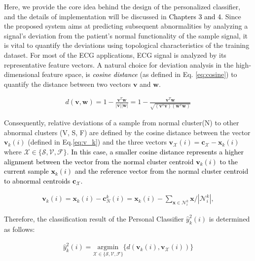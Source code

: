 Here, we provide the core idea behind the design of the personalized classifier, and the details of implementation will be discussed in \textcolor{black}{Chapters 3 and 4.} 
Since the proposed system aims at predicting subsequent abnormalities by analyzing a signal's deviation from the patient's normal functionality of the sample signal, it is vital to quantify the deviations using topological characteristics of the training dataset. For most of the ECG applications, ECG signal is analyzed by its representative feature vectors. A natural choice for deviation analysis in the high-dimensional feature space, is \textcolor{black}{\textit{cosine distance}} (as defined in Eq. \ref{eq:cosine}) to quantify the distance between two vectors $\textbf{v}$ and $\textbf{w}$.

\begin{align}
\label{eq:cosine}
d(\mathbf{v},\mathbf{w})= 1 - \frac{\mathbf{v}^T\mathbf{w}}{|\mathbf{v}||\mathbf{w}|}=1 - \frac{\mathbf{v}^T\mathbf{w}}{\sqrt{(\mathbf{v}^T\mathbf{v})(\mathbf{w}^T\mathbf{w})}}
\end{align}

Consequently, relative deviations of a sample from normal cluster(N) to other abnormal clusters (V, S, F) are defined by the cosine distance between the vector $\mathbf{v}_k(i)$ (defined in Eq.\ref{eq:v_k}) and the three vectors $\mathbf{v}_{\mathcal{X}}(i)=\mathbf{c}_{\mathcal{X}}-\mathbf{x}_k(i)$ where $\mathcal{X} \in \{ \mathcal{S}, \mathcal{V}, \mathcal{F}\}$. \textcolor{black}{In this case, a smaller cosine distance represents a higher alignment between the vector from the normal cluster centroid $\mathbf{v}_k(i)$ to the current sample $\mathbf{x}_k(i)$ and the reference vector from the normal cluster centroid to abnormal centroids $\mathbf{c}_{\mathcal{X}}$.}


\begin{align}
\label{eq:v_k}
\mathbf{v}_k(i)=\mathbf{x}_k(i)-\mathbf{c}_N^k(i) = \mathbf{x}_k(i)- {\sum_{\mathbf{x} \in \mathcal{N}_i^k} \mathbf{x}}/{|\mathcal{N}_i^k|}, 
\end{align}

Therefore, the classification result of the Personal Classifier $\hat{y}^2_k(i)$ is determined as follows:

\begin{align}
\label{eq:personal_discrim}
\hat{y}^2_k(i) = \underset{\mathcal{X} \in \{ \mathcal{S}, \mathcal{V}, \mathcal{F} \}}{\text{argmin}}\{ d(\mathbf{v}_k(i),\mathbf{v}_{\mathcal{X}}(i)) \} 
\end{align}


